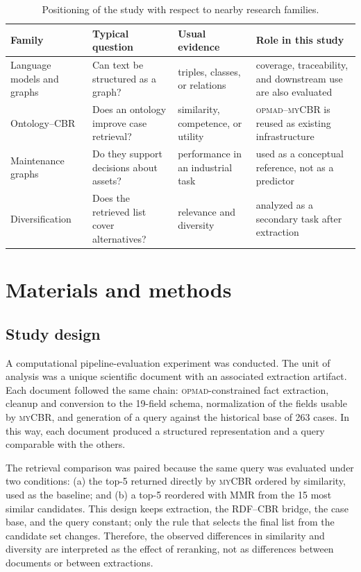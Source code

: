 \documentclass[journal]{IEEEtran}
\newcommand{\OPMAD}{\textsc{opmad}}
\newcommand{\myCBR}{\textsc{myCBR}}
\begin{document}
\begin{table}[!t]
\centering
\caption{Positioning of the study with respect to nearby research families.}
\label{tab:positioning}
\footnotesize
\begin{tabularx}{\linewidth}{lYYY}
\toprule
Family & Typical question & Usual evidence & Role in this study \\
\midrule
Language models and graphs & Can text be structured as a graph? & triples, classes, or relations & coverage, traceability, and downstream use are also evaluated \\
Ontology--CBR & Does an ontology improve case retrieval? & similarity, competence, or utility & \OPMAD{}--\myCBR{} is reused as existing infrastructure \\
Maintenance graphs & Do they support decisions about assets? & performance in an industrial task & used as a conceptual reference, not as a predictor \\
Diversification & Does the retrieved list cover alternatives? & relevance and diversity & analyzed as a secondary task after extraction \\
\bottomrule
\end{tabularx}
\end{table}

\section{Materials and methods}
\label{sec:methods}

\subsection{Study design}

A computational pipeline-evaluation experiment was conducted. The unit of analysis was a unique scientific document with an associated extraction artifact. Each document followed the same chain: \OPMAD{}-constrained fact extraction, cleanup and conversion to the 19-field schema, normalization of the fields usable by \myCBR{}, and generation of a query against the historical base of 263 cases. In this way, each document produced a structured representation and a query comparable with the others.

The retrieval comparison was paired because the same query was evaluated under two conditions: (a) the top-5 returned directly by \myCBR{} ordered by similarity, used as the baseline; and (b) a top-5 reordered with MMR from the 15 most similar candidates. This design keeps extraction, the RDF--CBR bridge, the case base, and the query constant; only the rule that selects the final list from the candidate set changes. Therefore, the observed differences in similarity and diversity are interpreted as the effect of reranking, not as differences between documents or between extractions.
\end{document}
